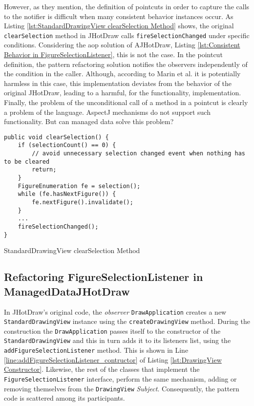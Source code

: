 However, as they mention, the definition of pointcuts in order to capture the calls to the notifier is difficult when many consistent behavior instances occur. 
As Listing \ref{lst:StandardDrawingView clearSelection Method} shows, the original \texttt{clearSelection} method in JHotDraw calls \texttt{fireSelectionChanged} under specific conditions.
Considering the \ac{aop} solution of AJHotDraw, Listing \ref{lst:Consistent Behavior in FigureSelectionListener}, this is not the case.
In the pointcut definition, the pattern refactoring solution notifies the observers independently of the condition in the caller.
Although, according to Marin et al. it is potentially harmless in this case, this implementation deviates from the behavior of the original JHotDraw, leading to a harmful, for the functionality, implementation.
Finally, the problem of the unconditional call of a method in a pointcut is clearly a problem of the language.
AspectJ mechanisms do not support such functionality.
But can managed data solve this problem?

\begin{sourcecode}
	\begin{lstlisting}[language=AspectJ, escapechar=|]
public void clearSelection() {
	if (selectionCount() == 0) {
		// avoid unnecessary selection changed event when nothing has to be cleared
		return;
	}
	FigureEnumeration fe = selection();
	while (fe.hasNextFigure()) {
		fe.nextFigure().invalidate();
	}
	...
	fireSelectionChanged();
}
	\end{lstlisting}
	\caption{StandardDrawingView clearSelection Method}
	\label{lst:StandardDrawingView clearSelection Method}
\end{sourcecode}

\subsection{Refactoring FigureSelectionListener in ManagedDataJHotDraw}
In JHotDraw's original code, the \textit{observer} \texttt{DrawApplication} creates a new \texttt{StandardDrawingView} instance using the \texttt{createDrawingView} method.
During the construction the \texttt{DrawApplication} passes itself to the constructor of the \texttt{StandardDrawingView} and this in turn adds it to its listeners list, using the \texttt{addFigureSelectionListener} method.
This is shown in Line \ref{line:addFigureSelectionListener_contructor} of Listing \ref{lst:DrawingView Constructor}.
Likewise, the rest of the classes that implement the \texttt{FigureSelectionListener} interface, perform the same mechanism, adding or removing themselves from the \texttt{DrawingView} \textit{Subject}.
Consequently, the pattern code is scattered among its participants.

